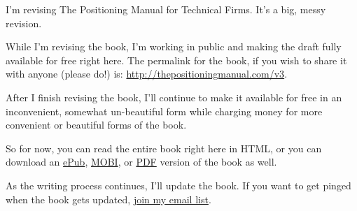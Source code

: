 I'm revising The Positioning Manual for Technical Firms. It's a big, messy revision.

While I'm revising the book, I'm working in public and making the draft fully available for free right here. The permalink for the book, if you wish to share it with anyone (please do!) is: \href{http://thepositioningmanual.com/v3}{http://thepositioningmanual.com/v3}.

After I finish revising the book, I'll continue to make it available for free in an inconvenient, somewhat un-beautiful form while charging money for more convenient or beautiful forms of the book.

So for now, you can read the entire book right here in HTML, or you can download an \href{../ebooks/TPM-v3.epub}{ePub}, \href{../ebooks/TPM-v3.mobi}{MOBI}, or \href{../ebooks/TPM-v3.pdf}{PDF} version of the book as well.

As the writing process continues, I'll update the book. If you want to get pinged when the book gets updated, \href{https://philipmorganconsulting.com/list}{join my email list}.